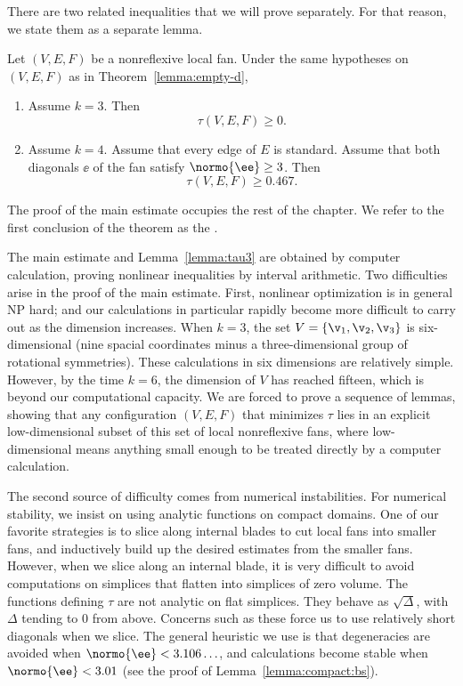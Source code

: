 There are two related inequalities that we will prove separately. For that reason,
we state them as a separate lemma.

\begin{lemma}\label{lemma:tau3}
Let $(V,E,F)$ be a nonreflexive local fan.
Under the same hypotheses on $(V,E,F)$ as in Theorem~\ref{lemma:empty-d}, 
\begin{enumerate}
\item Assume $k=3$. Then
\[\tau(V,E,F)\ge 0.\]
\item Assume $k=4$.  Assume that every edge of $E$ is standard.
Assume that both diagonals $\ee$ of the fan satisfy $\normo{\ee}\ge3$.
Then
\[
\tau(V,E,F)\ge 0.467.
\]
\end{enumerate}
\end{lemma}

The proof of the main estimate occupies the rest of the chapter.
We refer to the first conclusion of the theorem as the .  

The main estimate and Lemma~\ref{lemma:tau3} are obtained by computer
calculation, proving nonlinear inequalities by interval arithmetic.
Two  difficulties
arise in the proof of  the main estimate.  First, nonlinear optimization is
in general NP hard; and our calculations in particular rapidly become
more difficult to carry out as the dimension increases.  When $k=3$,
the set $V=\{\v_1,\v_2,\v_3\}$ is six-dimensional (nine spacial
coordinates minus a three-dimensional group of rotational symmetries).
These calculations in six dimensions are relatively simple.  However,
by the time $k=6$, the dimension of $V$ has reached fifteen, which is 
beyond our computational capacity.  We are forced to prove a sequence of
lemmas, showing that any configuration $(V,E,F)$ that minimizes $\tau$
lies in an explicit low-dimensional subset of this set of local
nonreflexive fans, where low-dimensional means anything small enough
to be treated directly by a computer calculation.

The second source of difficulty comes from numerical instabilities.
For numerical stability, we insist on using analytic functions on
compact domains.  One of our favorite strategies is to slice along
internal blades to cut local fans into smaller fans, and inductively
build up the desired estimates from the smaller fans.  However, when
we slice along an internal blade, it is very difficult to avoid computations on
simplices that flatten into simplices of zero volume.  
The functions defining $\tau$ are not analytic on flat simplices. They behave as
$\sqrt{\Delta}$, with $\Delta$ tending to $0$ from above.  Concerns
such as these force us to use relatively short diagonals when we
slice.  The general heuristic we use is that degeneracies are avoided when
$\normo{\ee}< 3.106\ldots$, and calculations become stable
when $\normo{\ee}<3.01$  (see the proof of
Lemma~\ref{lemma:compact:bs}).

